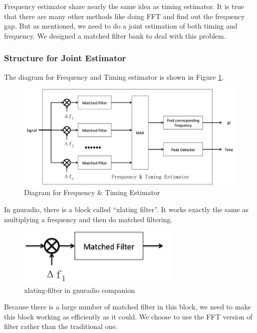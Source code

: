 \documentclass[a4paper]{report}
\begin{document}
Frequency estimator share nearly the same idea as timing estimator. It is true that there are many other methods like doing FFT and find out the frequency gap. But as mentioned, we need to do a joint estimation of both timing and frequency. We designed a matched filter bank to deal with this problem.

\subsubsection{Structure for Joint Estimator} %

The diagram for Frequency and Timing estimator is shown in Figure \ref{fig:Diagram for Frequency and Timing Estimator}.
\label{ssub:structure_for_joint_estimator}
\begin{figure}[ht]
	\centering
	\includegraphics[width = 5in]{figure/frequency_and_timing_estimator_diagram.png}
	\caption{Diagram for Frequency \& Timing Estimator}
	\label{fig:Diagram for Frequency and Timing Estimator}
\end{figure}

In gnuradio, there is a block called ``xlating filter''. It works exactly the same as multiplying a frequency and then do matched filtering. 
\begin{figure}[ht]
	\centering
	\includegraphics[width = 3in]{figure/xlating_filter_diagram.png}
	\caption{xlating-filter in gnuradio companion}
	\label{fig:xlating filter in gnuradio companion}
\end{figure}

Because there is a large number of matched filter in this block, we need to make this block working as efficiently as it could. We choose to use the FFT version of filter rather than the traditional one.
\end{document}
